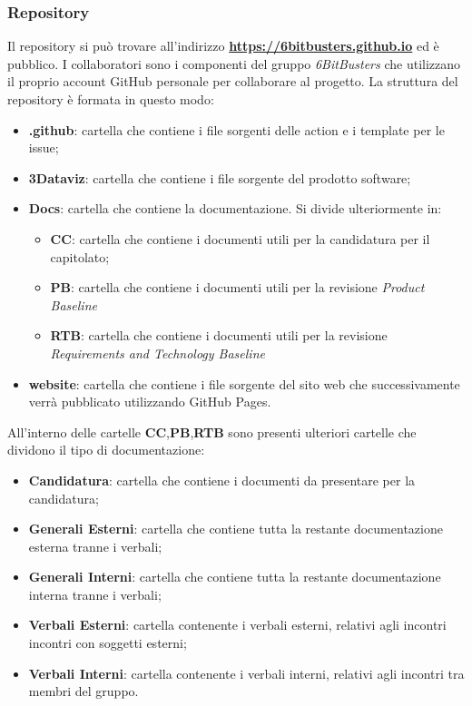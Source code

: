 \subsubsection{Repository}
Il repository si può trovare all'indirizzo
\textbf{\url{https://6bitbusters.github.io}} ed è pubblico. I collaboratori
sono i componenti del gruppo \textit{6BitBusters} che utilizzano il proprio
account GitHub personale per collaborare al progetto. La struttura del
repository è formata in questo modo:
\begin{itemize}
      \item \textbf{ .github}: cartella che contiene i file sorgenti delle action e i template per le issue;
      \item \textbf{3Dataviz}: cartella che contiene i file sorgente del prodotto software;
      \item \textbf{Docs}: cartella che contiene la documentazione. Si divide ulteriormente in:
            \begin{itemize}
                  \item \textbf{CC}: cartella che contiene i documenti utili per la candidatura per il capitolato;
                  \item \textbf{PB}: cartella che contiene i documenti utili per la revisione \textit{Product Baseline} 
                  \item \textbf{RTB}: cartella che contiene i documenti utili per la revisione \textit{Requirements and Technology Baseline} 
            \end{itemize}
      \item \textbf{website}: cartella che contiene i file sorgente del sito web che successivamente verrà pubblicato utilizzando GitHub Pages.
\end{itemize}
\newpage
All'interno delle cartelle \textbf{CC},\textbf{PB},\textbf{RTB} sono presenti ulteriori cartelle che dividono il tipo di documentazione:
\begin{itemize}
      \item \textbf{Candidatura}: cartella che contiene i documenti da presentare per la candidatura;
      \item \textbf{Generali Esterni}: cartella che contiene tutta la restante documentazione esterna tranne i verbali;
      \item \textbf{Generali Interni}: cartella che contiene tutta la restante documentazione interna tranne i verbali;
      \item \textbf{Verbali Esterni}: cartella contenente i verbali esterni, relativi agli incontri incontri con soggetti esterni;
      \item \textbf{Verbali Interni}: cartella contenente i verbali interni, relativi agli incontri tra membri del gruppo.
\end{itemize}

